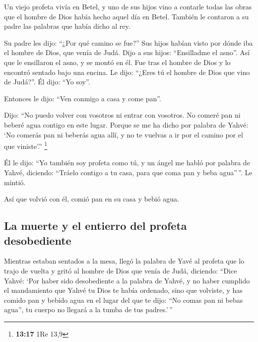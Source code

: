 \begin{paracol}{2}
 Un viejo profeta vivía en Betel, y uno de sus hijos vino
a contarle todas las obras que el hombre de Dios había hecho aquel día
en Betel. También le contaron a su padre las palabras que había dicho al
rey.

 Su padre les dijo: ``¿Por qué camino se fue?'' Sus hijos
habían visto por dónde iba el hombre de Dios, que venía de Judá.
 Dijo a sus hijos: ``Ensilladme el asno''. Así que le
ensillaron el asno, y se montó en él.  Fue tras el hombre
de Dios y lo encontró sentado bajo una encina. Le dijo: ``¿Eres tú el
hombre de Dios que vino de Judá?''. Él dijo: ``Yo soy''.

 Entonces le dijo: ``Ven conmigo a casa y come pan''.

 Dijo: ``No puedo volver con vosotros ni entrar con
vosotros. No comeré pan ni beberé agua contigo en este lugar.
 Porque se me ha dicho por palabra de Yahvé: `No comerás
pan ni beberás agua allí, y no te vuelvas a ir por el camino por el que
viniste'.'' \footnote{\textbf{13:17} 1Re 13,9}

 Él le dijo: ``Yo también soy profeta como tú, y un ángel
me habló por palabra de Yahvé, diciendo: ``Tráelo contigo a tu casa,
para que coma pan y beba agua''\,''. Le mintió.

 Así que volvió con él, comió pan en su casa y bebió
agua.

\hypertarget{la-muerte-y-el-entierro-del-profeta-desobediente}{%
\subsection{La muerte y el entierro del profeta
desobediente}\label{la-muerte-y-el-entierro-del-profeta-desobediente}}

 Mientras estaban sentados a la mesa, llegó la palabra de
Yavé al profeta que lo trajo de vuelta  y gritó al hombre
de Dios que venía de Judá, diciendo: ``Dice Yahvé: `Por haber sido
desobediente a la palabra de Yahvé, y no haber cumplido el mandamiento
que Yahvé tu Dios te había ordenado,  sino que volviste,
y has comido pan y bebido agua en el lugar del que te dijo: ``No comas
pan ni bebas agua'', tu cuerpo no llegará a la tumba de tus padres.'\,''


\end{paracol}
